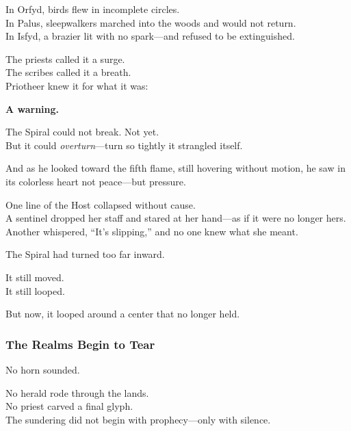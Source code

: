 \documentclass[12pt]{article}
\begin{document}
\vspace{0.5em}
In Orfyd, birds flew in incomplete circles.\\
In Palus, sleepwalkers marched into the woods and would not return.\\
In Isfyd, a brazier lit with no spark---and refused to be extinguished.

\vspace{0.5em}
The priests called it a surge.\\
The scribes called it a breath.\\
Priotheer knew it for what it was:

\vspace{0.5em}
\textbf{A warning.}

\vspace{0.5em}
The Spiral could not break. Not yet.\\
But it could \textit{overturn}---turn so tightly it strangled itself.

\vspace{0.5em}
And as he looked toward the fifth flame, still hovering without motion, he saw in its colorless heart not peace---but pressure.

\vspace{0.5em}
One line of the Host collapsed without cause.\\
A sentinel dropped her staff and stared at her hand---as if it were no longer hers.\\
Another whispered, ``It’s slipping,'' and no one knew what she meant.

\vspace{0.5em}
The Spiral had turned too far inward.

\vspace{0.5em}
It still moved.\\
It still looped.

\vspace{0.5em}
But now, it looped around a center that no longer held.

\dotfill

\subsubsection{The Realms Begin to Tear}

No horn sounded.

\vspace{0.5em}
No herald rode through the lands.\\
No priest carved a final glyph.\\
The sundering did not begin with prophecy---only with silence.
\end{document}
